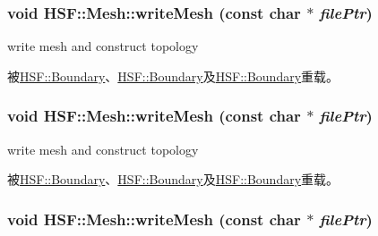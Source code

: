 \label{classHSF_1_1Mesh_a39999f4b36df55778f07f6696985052f}
\hypertarget{classHSF_1_1Mesh_a2cd3b5d0f1dcf97d7b4cb565b32bcaf8}{
\subsubsection[{writeMesh}]{\setlength{\rightskip}{0pt plus 5cm}void HSF::Mesh::writeMesh (const char $\ast$ {\em filePtr})}}
\label{classHSF_1_1Mesh_a2cd3b5d0f1dcf97d7b4cb565b32bcaf8}


write mesh and construct topology 

被\hyperlink{classHSF_1_1Boundary_aa9891dd719196ca7307e0327d1eaf39f}{HSF::Boundary}、\hyperlink{classHSF_1_1Boundary_aa9891dd719196ca7307e0327d1eaf39f}{HSF::Boundary}及\hyperlink{classHSF_1_1Boundary_aa9891dd719196ca7307e0327d1eaf39f}{HSF::Boundary}重载。\hypertarget{classHSF_1_1Mesh_a2cd3b5d0f1dcf97d7b4cb565b32bcaf8}{
\subsubsection[{writeMesh}]{\setlength{\rightskip}{0pt plus 5cm}void HSF::Mesh::writeMesh (const char $\ast$ {\em filePtr})}}
\label{classHSF_1_1Mesh_a2cd3b5d0f1dcf97d7b4cb565b32bcaf8}


write mesh and construct topology 

被\hyperlink{classHSF_1_1Boundary_aa9891dd719196ca7307e0327d1eaf39f}{HSF::Boundary}、\hyperlink{classHSF_1_1Boundary_aa9891dd719196ca7307e0327d1eaf39f}{HSF::Boundary}及\hyperlink{classHSF_1_1Boundary_aa9891dd719196ca7307e0327d1eaf39f}{HSF::Boundary}重载。\hypertarget{classHSF_1_1Mesh_a2cd3b5d0f1dcf97d7b4cb565b32bcaf8}{
\subsubsection[{writeMesh}]{\setlength{\rightskip}{0pt plus 5cm}void HSF::Mesh::writeMesh (const char $\ast$ {\em filePtr})}}
\label{classHSF_1_1Mesh_a2cd3b5d0f1dcf97d7b4cb565b32bcaf8}


